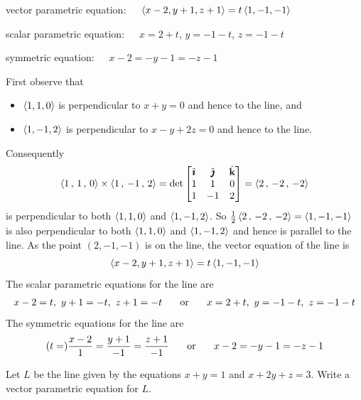 \begin{answer}
vector parametric equation:\ \ \ $\left< x-2,y+1,z+1\right>= t\left< 1,-1,-1\right>$

scalar parametric equation:\ \ \ $x=2+t$,  $y=-1-t$,  $z=-1-t$

symmetric equation:\ \ \ $x-2=-y-1=-z-1$
\end{answer}

\begin{solution}
First observe that
\begin{itemize}
\item
$\left< 1,1,0\right>$ is perpendicular to $x+y=0$  and hence to the line, and
\item
$\left< 1,-1,2\right>$ is perpendicular to $x-y+2z=0$  and hence to the line.
\end{itemize}
Consequently
\begin{align*}
\left< 1\,,\,1\,,\,0\right> \times \left< 1\,,\,-1\,,\,2\right>
    =\det\left[\begin{matrix}
            \hat{\pmb{\imath}}  &  \hat{\pmb{\jmath}}  &  \hat{\mathbf{k}} \\
            1    &   1   &   0 \\
            1    &  -1   &   2 
            \end{matrix}\right]
=\left< 2 \,,\, -2 \,,\, -2 \right>
\end{align*}
is perpendicular to both $\left< 1,1,0\right>$ and $\left< 1,-1,2\right>$.
So $\frac{1}{2}\left< 2 \,,\, -2 \,,\, -2 \right>=\left< 1,-1,-1\right>\>$
is also perpendicular to both $\left< 1,1,0\right>$ and $\left< 1,-1,2\right>$
and hence is parallel to the line. As the point $(2,-1,-1)$ is on the line,
the vector  equation of the line is
\begin{equation*}
\left< x-2,y+1,z+1\right>= t\left< 1,-1,-1\right>
\end{equation*}
The scalar parametric equations for the line are
\begin{align*}
x-2=t,\ 
y+1=-t,\ 
z+1=-t
\hskip .25 in\hbox{or}\hskip .25 in
x=2+t,\ 
y=-1-t,\ 
z=-1-t
\end{align*}
The symmetric equations for the line are
\begin{align*}
(t=)\frac{x-2}{1}=\frac{y+1}{-1}=\frac{z+1}{-1}
\hskip .25 in\hbox{or}\hskip .25 in
x-2=-y-1=-z-1
\end{align*}


\end{solution}

\begin{question}[M200 2011A] %
Let  $L$ be the line given by the equations $x + y = 1$ and
$x + 2y + z = 3$.
Write a vector parametric equation for $L$.
\end{question}

